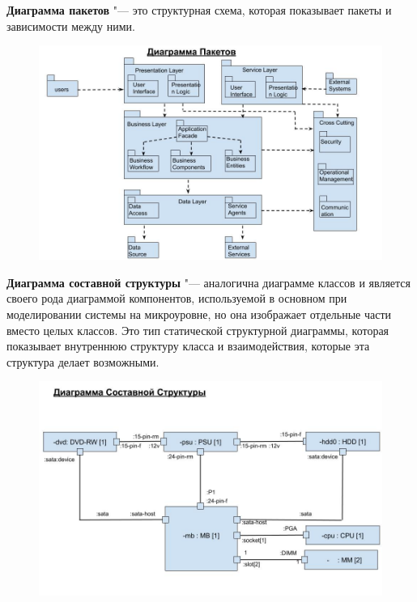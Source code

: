 \documentclass[bachelor, och, pract]{SCWorks}
\theoremstyle{remark}
\begin{document}
    \newpage
    \textbf{Диаграмма пакетов} "--- это структурная схема, которая показывает пакеты и зависимости между ними.

    \begin{figure}[H]
        \begin{center}
            \includegraphics[scale=0.5]{res/package-diagram.png}
        \end{center}
    \end{figure}
    
    \newpage
    \textbf{Диаграмма составной структуры} "--- аналогична диаграмме классов и является своего рода диаграммой компонентов, используемой в основном при моделировании системы на микроуровне, но она изображает отдельные части вместо целых классов. Это тип статической структурной диаграммы, которая показывает внутреннюю структуру класса и взаимодействия, которые эта структура делает возможными.
    
    \begin{figure}[H]
        \begin{center}
            \includegraphics[scale=0.5]{res/composite-structure-diagram.png}
        \end{center}
    \end{figure}
    
\end{document}
